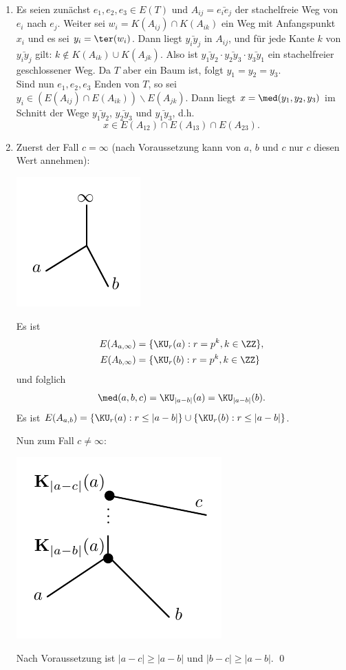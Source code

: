 \bew\ \begin{enumerate}
\item Es seien zunächst $e_1,e_2,e_3\in E(T)$ und
$A_{ij}=\bar{e_i e_j}$ der stachelfreie Weg von $e_i$ nach $e_j$.
Weiter sei $w_i=K(A_{ij})\cap K(A_{ik})$ ein Weg mit Anfangspunkt
$x_i$ und es sei $y_i=\ter(w_i)$.
Dann liegt $\bar{y_i y_j}$ in $A_{ij}$, und für jede Kante $k$ von
$\bar{y_i y_j}$ gilt: $k\not\in K(A_{ik})\cup K(A_{jk})$.
Also ist $\bar{y_1 y_2}\cdot\bar{y_2 y_3}\cdot\bar{y_3 y_1}$
ein stachelfreier
geschlossener Weg. Da $T$ aber ein Baum ist, folgt $y_1=y_2=y_3$.\\
Sind nun $e_1,e_2,e_3$ Enden von $T$, so sei
$y_i\in (E(A_{ij})\cap E(A_{ik}))\backslash E(A_{jk})$. Dann liegt
$x=\med(y_1,y_2,y_3)$ im Schnitt der Wege $\bar{y_1 y_2}$,
$\bar{y_2 y_3}$ und $\bar{y_1 y_3}$, d.h.
\[
x \in E(A_{12})\cap E(A_{13}) \cap E(A_{23}).
\]
\item
Zuerst der Fall $c=\infty$ (nach Voraussetzung kann von $a$, $b$ und
$c$ nur
$c$ diesen Wert annehmen):
\begin{center}
	\includegraphics{grugraImages/enden1}
\end{center}
Es ist
\begin{align*}
E(A_{a,\infty}) &= \{\KU_r(a) : r=p^k, k\in\ZZ \}, \\
E(A_{b,\infty}) &= \{\KU_r(b) : r=p^k, k\in\ZZ \}
\end{align*}
und folglich
\[
\med(a,b,c)=\KU_{|a-b|}(a)=\KU_{|a-b|}(b).
\]
Es ist $E(A_{a,b})=\{\KU_r(a):r\leq |a-b|\}\cup
\{\KU_r(b):r\leq|a-b|\}$.

Nun zum Fall $c\neq\infty$:
\begin{center}
	\includegraphics{grugraImages/enden2}
\end{center}
Nach Voraussetzung ist $|a-c|\geq |a-b|$ und $|b-c|\geq |a-b|$.
\qed
\end{enumerate}


